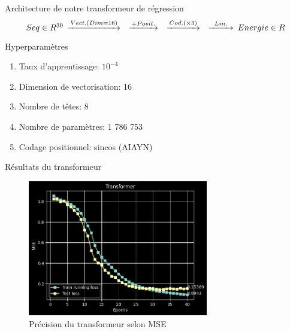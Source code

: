 \documentclass{beamer}
\begin{document}
\begin{frame}{Architecture de notre transformeur de régression}
\begin{equation*}
    \begin{CD}
        @. Seq \in R^{30}
        @>Vect. (Dim=16)>> 
        @>+Posit.>> 
        @>Cod. (\times 3)>> 
        @>Lin.>> Energie \in R
    \end{CD}
\end{equation*}

\begin{block}{Hyperparamètres}
\begin{enumerate}
    \item Taux d'apprentissage: $10^{-4}$
    \item Dimension de vectorisation: 16
    \item Nombre de têtes: 8
    \item Nombre de paramètres: 1 786 753 
    \item Codage positionnel: sincos (AIAYN)
\end{enumerate}
\end{block}
\end{frame}


\begin{frame}{Résultats du transformeur}
\begin{figure} \label{fig:transformer_accuracy}
    \caption{Précision du transformeur selon MSE} \center
    \includegraphics[width=0.7\textwidth]{images/2023-04-02-13-48-49.png}
\end{figure}
\end{frame}
\end{document}
